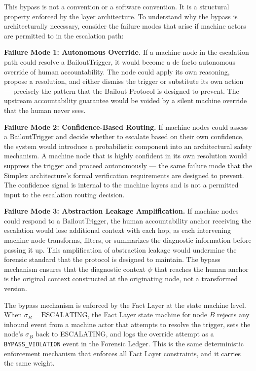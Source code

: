 This bypass is not a convention or a software convention. It is a structural property enforced by the layer architecture. To understand why the bypass is architecturally necessary, consider the failure modes that arise if machine actors are permitted to in the escalation path:

\bigskip

\noindent\textbf{Failure Mode 1: Autonomous Override.} If a machine node in the escalation path could resolve a BailoutTrigger, it would become a de facto autonomous override of human accountability. The node could apply its own reasoning, propose a resolution, and either dismiss the trigger or substitute its own action --- precisely the pattern that the Bailout Protocol is designed to prevent. The upstream accountability guarantee would be voided by a silent machine override that the human never sees.

\bigskip

\noindent\textbf{Failure Mode 2: Confidence-Based Routing.} If machine nodes could assess a BailoutTrigger and decide whether to escalate based on their own confidence, the system would introduce a probabilistic component into an architectural safety mechanism. A machine node that is highly confident in its own resolution would suppress the trigger and proceed autonomously --- the same failure mode that the Simplex architecture's formal verification requirements are designed to prevent. The confidence signal is internal to the machine layers and is not a permitted input to the escalation routing decision.

\bigskip

\noindent\textbf{Failure Mode 3: Abstraction Leakage Amplification.} If machine nodes could respond to a BailoutTrigger, the human accountability anchor receiving the escalation would lose additional context with each hop, as each intervening machine node transforms, filters, or summarizes the diagnostic information before passing it up. This amplification of abstraction leakage would undermine the forensic standard that the protocol is designed to maintain. The bypass mechanism ensures that the diagnostic context $\psi$ that reaches the human anchor is the original context constructed at the originating node, not a transformed version.

\bigskip

The bypass mechanism is enforced by the Fact Layer at the state machine level. When $\sigma_B = \text{ESCALATING}$, the Fact Layer state machine for node $B$ rejects any inbound event from a machine actor that attempts to resolve the trigger, sets the node's $\sigma_B$ back to ESCALATING, and logs the override attempt as a \texttt{BYPASS\_VIOLATION} event in the Forensic Ledger. This is the same deterministic enforcement mechanism that enforces all Fact Layer constraints, and it carries the same weight.

